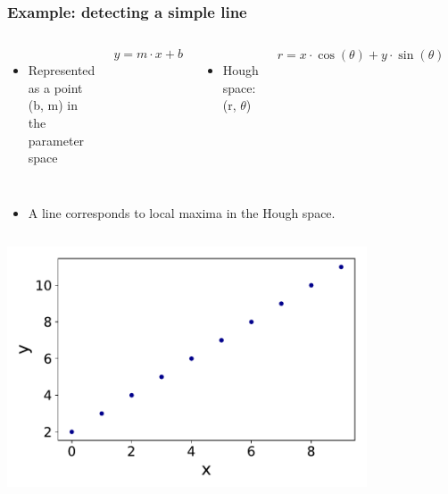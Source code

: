 \documentclass[aspectratio=169, hyperref={colorlinks=true,pdfpagelabels=false,linkcolor=black}, xcolor=dvipsnames,10pt]{beamer}
\begin{document}
\begin{frame}
  \frametitle{Example: detecting a simple line}

  \begin{columns}
    \begin{itemize}
      \item Represented as a point (b, m) in the parameter space
    \end{itemize}
    \begin{equation}
      y = m \cdot x + b
    \end{equation}

    \begin{itemize}
      \item Hough space: (r, $\theta$)
    \end{itemize}
    \begin{equation}
      r = x \cdot \cos(\theta) + y \cdot \sin(\theta)
    \end{equation}

      \centering
      \includegraphics[width=0.8\textwidth]{figures/linepic}

  \end{columns}

  \begin{itemize}
    \item A line corresponds to local maxima in the Hough space.
  \end{itemize}

  \begin{columns}
      \centering
      \includegraphics[width=0.8\textwidth]{figures/line.pdf}


\end{columns}
\end{frame}
\end{document}

